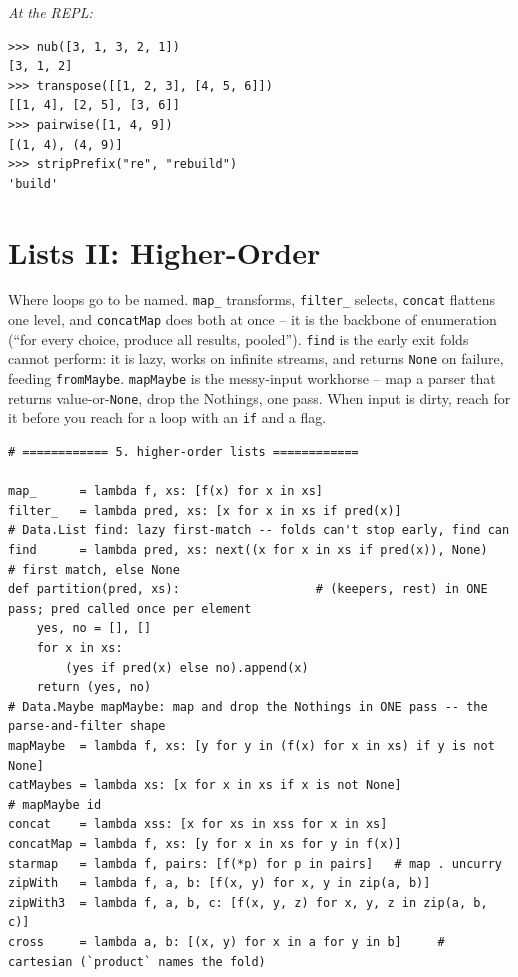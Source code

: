 \documentclass[11pt,letterpaper]{book}
\begin{document}
\noindent\textit{At the REPL:}
\begin{lstlisting}[style=spec]
>>> nub([3, 1, 3, 2, 1])
[3, 1, 2]
>>> transpose([[1, 2, 3], [4, 5, 6]])
[[1, 4], [2, 5], [3, 6]]
>>> pairwise([1, 4, 9])
[(1, 4), (4, 9)]
>>> stripPrefix("re", "rebuild")
'build'
\end{lstlisting}
\chapter{Lists II: Higher-Order}

Where loops go to be named. \texttt{map\_} transforms, \texttt{filter\_}
selects, \texttt{concat} flattens one level, and \texttt{concatMap} does both
at once -- it is the backbone of enumeration (``for every choice, produce all
results, pooled''). \texttt{find} is the early exit folds cannot perform: it is
lazy, works on infinite streams, and returns \texttt{None} on failure, feeding
\texttt{fromMaybe}. \texttt{mapMaybe} is the messy-input workhorse -- map a
parser that returns value-or-\texttt{None}, drop the Nothings, one pass. When
input is dirty, reach for it before you reach for a loop with an \texttt{if}
and a flag.
\begin{lstlisting}[style=code]
# ============ 5. higher-order lists ============

map_      = lambda f, xs: [f(x) for x in xs]
filter_   = lambda pred, xs: [x for x in xs if pred(x)]
# Data.List find: lazy first-match -- folds can't stop early, find can
find      = lambda pred, xs: next((x for x in xs if pred(x)), None)   # first match, else None
def partition(pred, xs):                   # (keepers, rest) in ONE pass; pred called once per element
    yes, no = [], []
    for x in xs:
        (yes if pred(x) else no).append(x)
    return (yes, no)
# Data.Maybe mapMaybe: map and drop the Nothings in ONE pass -- the parse-and-filter shape
mapMaybe  = lambda f, xs: [y for y in (f(x) for x in xs) if y is not None]
catMaybes = lambda xs: [x for x in xs if x is not None]                      # mapMaybe id
concat    = lambda xss: [x for xs in xss for x in xs]
concatMap = lambda f, xs: [y for x in xs for y in f(x)]
starmap   = lambda f, pairs: [f(*p) for p in pairs]   # map . uncurry
zipWith   = lambda f, a, b: [f(x, y) for x, y in zip(a, b)]
zipWith3  = lambda f, a, b, c: [f(x, y, z) for x, y, z in zip(a, b, c)]
cross     = lambda a, b: [(x, y) for x in a for y in b]     # cartesian (`product` names the fold)
\end{lstlisting}
\end{document}
